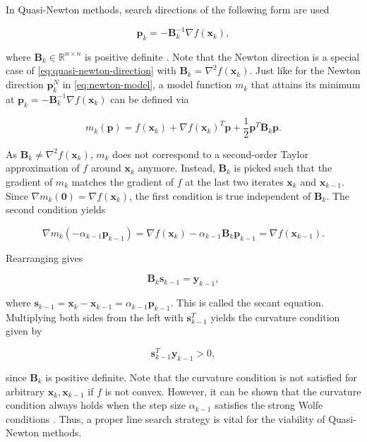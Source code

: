 In Quasi-Newton methods, search directions of the following form are used

\begin{equation}\label{eq:quasi-newton-direction}
    \bm{p}_k = -\bm{B}^{-1}_k \nabla f(\bm{x}_k),
\end{equation}

\noindent where $\bm{B}_k \in \mathbb{R}^{n \times n}$ is positive definite \cite{nocedal2006}. Note that the Newton direction is a special 
case of 
\cref{eq:quasi-newton-direction} with $\bm{B}_k = \nabla^2 f(\bm{x}_k)$. Just like for the Newton direction $\bm{p}^N_k$ in
\cref{eq:newton-model}, a model function $m_k$ 
that attains its minimum at $\bm{p}_k  = -\bm{B}^{-1}_k \nabla f(\bm{x}_k)$ can be defined via

\begin{equation}\label{eq:quasi-newton-model}
    m_k(\bm{p}) = f(\bm{x}_k)  + \nabla f(\bm{x}_k)^T \bm{p} + \frac{1}{2} \bm{p}^T\bm{B}_k\bm{p}.
\end{equation}

\noindent As $\bm{B}_k \neq \nabla^2 f(\bm{x}_k)$, $m_k$ does not correspond to a second-order Taylor approximation of $f$ around 
$\bm{x}_k$ anymore. Instead, $\bm{B}_k$ is picked such that the gradient of $m_k$ matches the gradient of $f$ at the last two iterates 
$\bm{x}_k$ and $\bm{x}_{k-1}$.
Since $\nabla m_{k}(\bm{0}) = \nabla f(\bm{x}_k)$, the first condition is true independent of $\bm{B}_k$. The 
second condition yields

\[
    \nabla m_{k}(-\alpha_{k-1}\bm{p}_{k-1}) = \nabla f(\bm{x}_k) - \alpha_{k-1}\bm{B}_{k}\bm{p}_{k-1} = \nabla f(\bm{x}_{k-1}).
\]

\noindent Rearranging gives

\begin{equation}\label{eq:secant-equation}
    \bm{B}_k \bm{s}_{k-1} = \bm{y}_{k-1},
\end{equation}

\noindent where $\bm{s}_{k-1} = \bm{x}_k - \bm{x}_{k-1} = \alpha_{k-1}\bm{p}_{k-1}$. This is called the secant equation. 
Multiplying both sides from the left with $\bm{s}_{k-1}^T$ yields the curvature condition given by

\begin{equation}\label{eq:curvature-condition}
    \bm{s}_{k-1}^T \bm{y}_{k-1} > 0,
\end{equation}

\noindent since $\bm{B}_k$ is positive definite. Note that the curvature condition is not satisfied for arbitrary $\bm{x}_k, \bm{x}_{k-1}$ 
if $f$ is 
not convex. However, it can be shown that the curvature condition always holds when the step size $\alpha_{k-1}$ satisfies the strong Wolfe 
conditions \cite{nocedal2006}. Thus, a proper line search strategy is vital for the viability of Quasi-Newton methods.

